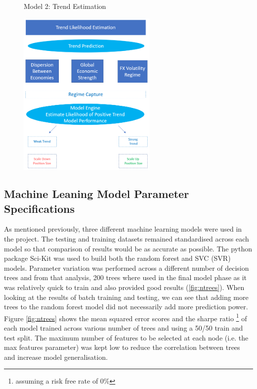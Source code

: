 \documentclass[11pt]{article}
\begin{document}
\begin{figure}[h]
    \centering
	\caption{Model 2: Trend Estimation}    
	\includegraphics[width=0.6\textwidth]{TrendEstimationv2}
    \label{fig:TrendEstimation}
     \caption*{}
\end{figure}

\subsection{Machine Leaning Model Parameter Specifications}
As mentioned previously, three different machine learning models were used in the project. The testing and training datasets remained standardised across each model so that comparison of results would be as accurate as possible. The python package Sci-Kit was used to build both the random forest and SVC (SVR) models. Parameter variation was performed across a different number of decision trees and from that analysis, 200 trees where used in the final model phase as it was relatively quick to train and also provided good results (\ref{fig:ntrees}). When looking at the results of batch training and testing, we can see that adding more trees to the random forest model did not necessarily add more prediction power. Figure \ref{fig:ntrees} shows the mean squared error scores and the sharpe ratio \footnote{assuming a risk free rate of 0\%} of each model trained across various number of trees and using a 50/50 train and test split. The maximum number of features to be selected at each node (i.e. the max features parameter) was kept low to reduce the correlation between trees and increase model generalisation.
\end{document}
